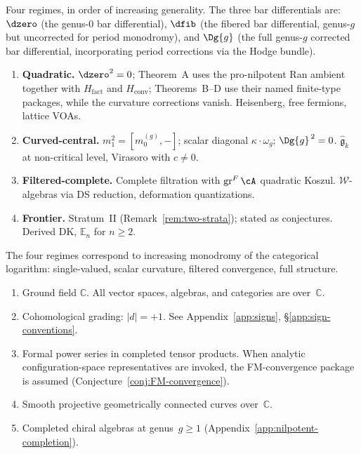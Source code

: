 \begin{convention}\label{conv:regime-tags}\label{conv:proof-architecture}
Four regimes, in order of increasing generality.
The three bar differentials are:
$\dzero$ (the genus-$0$ bar differential),
$\dfib$ (the fibered bar differential, genus-$g$ but
uncorrected for period monodromy), and
$\Dg{g}$ (the full genus-$g$ corrected bar differential,
incorporating period corrections via the Hodge bundle).
\begin{enumerate}
\item \textbf{Quadratic.} $\dzero^2 = 0$;
 Theorem~A uses the pro-nilpotent Ran ambient together with
 $H_{\mathrm{fact}}$ and $H_{\mathrm{conv}}$; Theorems~B--D use
 their named finite-type packages, while the
 curvature corrections vanish.
 Heisenberg, free fermions, lattice VOAs.
\item \textbf{Curved-central.}
 $m_1^2=[m_0^{(g)},-]$; scalar diagonal
 $\kappa \cdot \omega_g$; $\Dg{g}^{\,2} = 0$.
 $\widehat{\mathfrak{g}}_k$ at non-critical level, Virasoro
 with $c \neq 0$.
\item \textbf{Filtered-complete.} Complete filtration with
 $\operatorname{gr}^F \cA$ quadratic Koszul.
 $\mathcal{W}$-algebras via DS reduction, deformation
 quantizations.
\item \textbf{Frontier.} Stratum~II
 (Remark~\ref{rem:two-strata}); stated as conjectures.
 Derived DK, $\mathbb{E}_n$ for $n \geq 2$.
\end{enumerate}
The four regimes correspond to increasing monodromy of the
categorical logarithm: single-valued, scalar curvature, filtered
convergence, full structure.
\end{convention}

\begin{convention}
\label{conv:standing-assumptions}
\begin{enumerate}[label=\textup{(SA\arabic*)}]
\item\label{SA:ground-field} Ground field $\mathbb{C}$. All
 vector spaces, algebras, and categories are
 over~$\mathbb{C}$.
\item\label{SA:grading} Cohomological grading: $|d| = +1$.
 See Appendix~\ref{app:signs}, \S\ref{app:sign-conventions}.
\item\label{SA:convergence} Formal power series in completed
 tensor products. When analytic configuration-space representatives
 are invoked, the FM-convergence package is assumed
 (Conjecture~\ref{conj:FM-convergence}).
\item\label{SA:curves} Smooth projective geometrically connected
 curves over~$\mathbb{C}$.
\item\label{SA:completion} Completed chiral algebras at
 genus~$g \geq 1$
 (Appendix~\ref{app:nilpotent-completion}).
\end{enumerate}
\end{convention}

